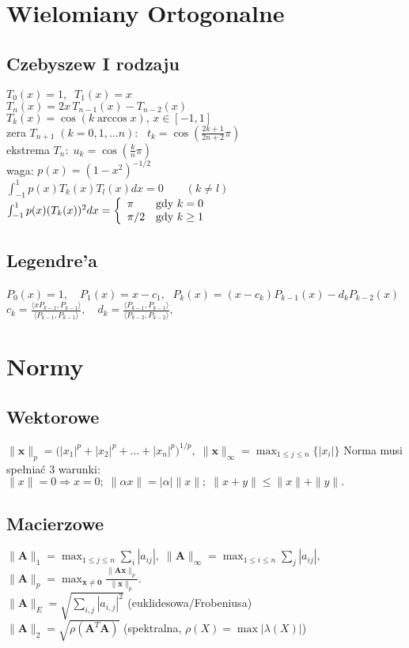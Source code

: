 \documentclass[a4paper,twocolumn]{article}
\begin{document}
\section{Wielomiany Ortogonalne}

\subsection{Czebyszew I rodzaju}
$T_0(x) = 1,\;\;T_1(x) = x$\\
$T_n(x) = 2x\,T_{n-1}(x) - T_{n-2}(x)$\\
$T_{k}(x) = \cos(k\arccos x),\,x\in [-1,1]$\\
zera $T_{n+1}\;(k=0,1,\ldots n)$: \, $t_k=\cos\left(\frac{2k+1}{2n+2}\pi\right)$\\
ekstrema $T_{n}:\; u_k = \cos\left(\frac{k}{n}\pi\right)$\\
waga: $p(x) = (1-x^2)^{-1/2}$\\
$ \int_{-1}^{1} p(x)T_k(x)T_l(x) dx = 0 \qquad (k \neq l) $\\
$  \int_{-1}^{1} p(x)(T_k(x))^2 dx = \left\{ \begin{array}{ll}
\pi & \textrm{gdy $k=0$}\\
\pi/2 & \textrm{gdy $ k \geq 1 $}
\end{array} \right.$
\subsection{Legendre'a}
$P_0(x) = 1, \quad P_1(x) = x-c_1,\;$
 $   P_k(x) = (x-c_k)P_{k-1}(x) - d_k P_{k-2}(x) $\\
$
    c_k = \frac{\langle x P_{k-1}, P_{k-1} \rangle}{\langle P_{k-1}, P_{k-1} \rangle}, \quad
    d_k = \frac{\langle P_{k-1}, P_{k-1} \rangle}{\langle P_{k-2}, P_{k-2} \rangle},
$
\section{Normy}
\subsection{Wektorowe}
${\displaystyle \|\mathbf {x} \|_{p}={\bigl (}|x_{1}|^{p}+|x_{2}|^{p}+\ldots +|x_{n}|^{p}{\bigr )}^{1/p},\;\|\mathbf {x} \|_{\infty }=\max_{1 \leq j \leq n} {\bigl \{}|x_{i}| {\bigr \}}}$
Norma musi spełniać 3 warunki:\\
${\displaystyle \|x\|=0\Rightarrow x=0;\; \|\alpha x\|=|\alpha |\|x\|;\;  \|x+y\|\leqslant \|x\|+\|y\|.}$
\subsection{Macierzowe}
${\displaystyle \|\mathbf {A} \|_{1}=\max _{1 \leq j \leq n}\sum _{i}|a_{ij}|,\; \|\mathbf {A} \|_{\infty }=\max _{1\leq i\leq n}\sum _{j}|a_{ij}|,\;}$\\
${\displaystyle \|\mathbf {A} \|_{p}=\max _{\mathbf {x} \neq \mathbf {0} }{\tfrac {\|\mathbf {Ax} \|_{p}}{\|\mathbf {x} \|_{p}}}.}$\\
${\displaystyle \|\mathbf {A} \|_{E}=\sqrt{\sum_{i,j}|a_{i,j}|^2}}$ (euklidesowa/Frobeniusa)\\
${\displaystyle \|\mathbf {A} \|_{2}=\sqrt{\rho(\mathbf{A}^T\mathbf{A})}}$ (spektralna, $\rho(X) = \max |\lambda(X)|$)
\end{document}

